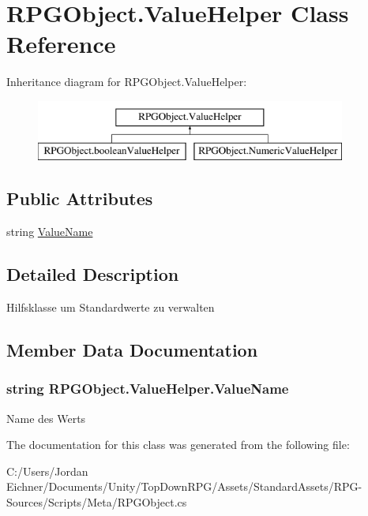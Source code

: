 \hypertarget{class_r_p_g_object_1_1_value_helper}{}\section{R\+P\+G\+Object.\+Value\+Helper Class Reference}
\label{class_r_p_g_object_1_1_value_helper}
Inheritance diagram for R\+P\+G\+Object.\+Value\+Helper\+:\begin{figure}[H]
\begin{center}
\leavevmode
\includegraphics[height=2.000000cm]{class_r_p_g_object_1_1_value_helper}
\end{center}
\end{figure}
\subsection*{Public Attributes}
\begin{DoxyCompactItemize}
\item 
string \hyperlink{class_r_p_g_object_1_1_value_helper_a7e533defe95f542b339bc1a8accab645}{Value\+Name}
\end{DoxyCompactItemize}


\subsection{Detailed Description}
Hilfsklasse um Standardwerte zu verwalten 

\subsection{Member Data Documentation}
\hypertarget{class_r_p_g_object_1_1_value_helper_a7e533defe95f542b339bc1a8accab645}{}
\subsubsection[{Value\+Name}]{\setlength{\rightskip}{0pt plus 5cm}string R\+P\+G\+Object.\+Value\+Helper.\+Value\+Name}\label{class_r_p_g_object_1_1_value_helper_a7e533defe95f542b339bc1a8accab645}
Name des Werts 

The documentation for this class was generated from the following file\+:\begin{DoxyCompactItemize}
\item 
C\+:/\+Users/\+Jordan Eichner/\+Documents/\+Unity/\+Top\+Down\+R\+P\+G/\+Assets/\+Standard\+Assets/\+R\+P\+G-\/\+Sources/\+Scripts/\+Meta/R\+P\+G\+Object.\+cs\end{DoxyCompactItemize}
